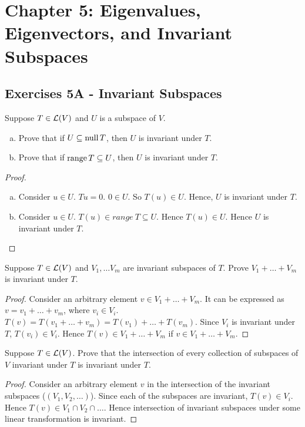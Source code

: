 \section*{Chapter 5: Eigenvalues, Eigenvectors, and Invariant Subspaces}

\subsection*{Exercises 5A - Invariant Subspaces}

\begin{problem}{1}
Suppose $T\in\mathcal{L}(V)$ and $U$ is a subspace of $V$.
\begin{enumerate}[(a)]
\item Prove that if $U\subseteq \operatorname{null} T$, then $U$ is invariant under $T$.
\item Prove that if $\operatorname{range} T\subseteq U$, then $U$ is invariant under $T$.
\end{enumerate}
\end{problem}
\begin{proof}

\begin{enumerate}[(a)]
\item Consider $u \in U$. $Tu = 0$. $0 \in U$. So $T(u) \in U$. Hence, $U$ is invariant under $T$.
\item Consider $u \in U$. $T(u) \in range\ T \subseteq U$. Hence $T(u) \in U$. Hence $U$ is invariant under $T$.  \qedhere
\end{enumerate}
\end{proof}

\begin{problem}{2}
Suppose $T\in\mathcal{L}(V)$ and $V_1, \ldots V_m$ are invariant subspaces of $T$. Prove $V_1 + \ldots + V_m$ is invariant under $T$.
\end{problem}
\begin{proof}
Consider an arbitrary element $v \in V_1 + \ldots + V_m$. It can be expressed as $v = v_1 + \ldots + v_m$, where $v_i \in V_i$.
$T(v) = T(v_1 + \ldots + v_m) = T(v_1) + \ldots + T(v_m)$. Since $V_i$ is invariant under $T$, $T(v_i) \in V_i$. 
Hence $T(v) \in V_1 + \ldots + V_m$ if $v \in V_1 + \ldots + V_m$.
\end{proof}

\begin{problem}{3}
Suppose $T\in\mathcal{L}(V)$. Prove that the intersection of every collection of subspaces of $V$ invariant under $T$ is invariant 
under $T$.
\end{problem}
\begin{proof}
Consider an arbitrary element $v$ in the intersection of the invariant subspaces ($(V_1, V_2, \ldots)$). Since each of the 
subspaces are invariant, $T(v) \in V_i$. Hence $T(v) \in V_1 \cap V_2 \cap \ldots$. Hence intersection of invariant subspaces
under some linear transformation is invariant.
\end{proof}

